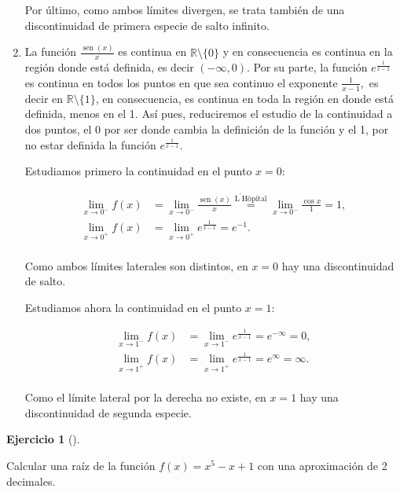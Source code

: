 \documentclass[
  a4paper,
]{scrreport}
\theoremstyle{definition}
\newtheorem{exercise}{Ejercicio}[chapter]
\theoremstyle{remark}
\begin{document}
\begin{tcolorbox}
\begin{enumerate}
  Por último, como ambos límites divergen, se trata también de una
  discontinuidad de primera especie de salto infinito.
\item
  La función \(\frac{\operatorname{sen}(x)}{x}\) es continua en
  \(\mathbb{R}\setminus{\{0\}}\) y en consecuencia es continua en la
  región donde está definida, es decir \((-\infty ,0)\). Por su parte,
  la función \(e^{\frac 1{x-1}}\) es continua en todos los puntos en que
  sea continuo el exponente \(\frac{1}{x-1},\) es decir en
  \(\mathbb{R}\setminus\{1\}\), en consecuencia, es continua en toda la
  región en donde está definida, menos en el 1. Así pues, reduciremos el
  estudio de la continuidad a dos puntos, el 0 por ser donde cambia la
  definición de la función y el 1, por no estar definida la función
  \(e^{\frac{1}{x-1}}.\)

  Estudiamos primero la continuidad en el punto \(x=0\):

  \begin{align*}
   \lim_{x\rightarrow 0^{-}}f(x) &= \lim_{x\rightarrow 0^{-}}\frac{\operatorname{sen}(x)}{x}\stackrel{\text{L}^{\prime }\text{H\^{o}pital}}{=} \lim_{x\rightarrow 0^{-}}\frac{\cos x}{1} = 1,\\
   \lim_{x\rightarrow 0^{+}}f(x) &= \lim_{x\rightarrow 0^{+}}e^{\frac{1}{x-1}} = e^{-1}.\\
   \end{align*}

  Como ambos límites laterales son distintos, en \(x=0\) hay una
  discontinuidad de salto.

  Estudiamos ahora la continuidad en el punto \(x=1\):

  \begin{align*}
   \lim_{x\rightarrow 1^{-}}f(x) &= \lim_{x\rightarrow 1^{-}}e^{\frac{1}{x-1}}=e^{-\infty }=0, \\
   \lim_{x\rightarrow 1^{+}}f(x) &= \lim_{x\rightarrow 1^{+}}e^{\frac{1}{x-1}}=e^\infty = \infty.\\ 
   \end{align*}

  Como el límite lateral por la derecha no existe, en \(x=1\) hay una
  discontinuidad de segunda especie.
\end{enumerate}

\end{tcolorbox}

\begin{exercise}[]\protect\hypertarget{exr-bolzano}{}\label{exr-bolzano}

Calcular una raíz de la función \(f(x)=x^5-x+1\) con una aproximación de
2 decimales.

\end{exercise}
\end{document}
